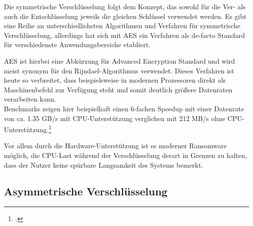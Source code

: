 Die symmetrische Verschlüsselung folgt dem Konzept, das sowohl für die Ver- als auch die Entschlüsselung jeweils die gleichen Schlüssel verwendet werden.
Es gibt eine Reihe an unterschiedlichsten Algorithmen und Verfahren für symmetrische Verschlüsselung, allerdings hat sich mit \textsc{AES} ein Verfahren als de-facto Standard für verschiedenste Anwendungsbereiche etabliert.

AES ist hierbei eine Abkürzung für Advanced Encryption Standard und wird meist synonym für den Rijndael-Algorithmus verwendet. Dieses Verfahren ist heute so verbreitet, dass beispielsweise in modernen Prozessoren direkt als Maschinenbefehl zur Verfügung steht und somit deutlich größere Datenraten verarbeiten kann. \\
Benchmarks zeigen hier beispielhaft einen 6-fachen Speedup mit einer Datenrate von ca. 1.35 GB/s mit CPU-Unterstützung verglichen mit 212 MB/s ohne
CPU-Unterstützung.\footcite{aes:benchmark}

Vor allem durch die Hardware-Unterstützung ist es moderner Ransomware möglich, die CPU-Last während der Verschlüsselung derart in Grenzen zu halten, dass der Nutzer keine spürbare Langsamkeit des Systems bemerkt.


\subsection{Asymmetrische Verschlüsselung}
\label{sec:asym_verschl}

